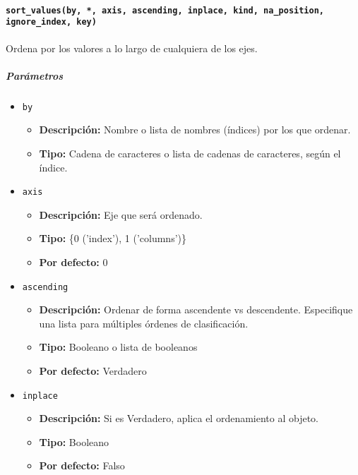 \paragraph{\texttt{sort\_values(by, *, axis, ascending, inplace, kind,
        na\_position, ignore\_index, key)}} Ordena por los valores a lo largo de
cualquiera de los ejes.

\subparagraph{\textbf{Parámetros}}
\begin{itemize}
    \item \texttt{by}
          \begin{itemize}
              \item \textbf{Descripción:} Nombre o lista de nombres (índices)
                    por los que ordenar.
              \item \textbf{Tipo:} Cadena de caracteres o lista de cadenas de
                    caracteres, según el índice.
          \end{itemize}

    \item \texttt{axis}
          \begin{itemize}
              \item \textbf{Descripción:} Eje que será ordenado.
              \item \textbf{Tipo:} \{0 ('index'), 1 ('columns')\}
              \item \textbf{Por defecto:} 0
          \end{itemize}

    \item \texttt{ascending}
          \begin{itemize}
              \item \textbf{Descripción:} Ordenar de forma ascendente vs
                    descendente. Especifique una lista para múltiples órdenes de clasificación.
              \item \textbf{Tipo:} Booleano o lista de booleanos
              \item \textbf{Por defecto:} Verdadero
          \end{itemize}

    \item \texttt{inplace}
          \begin{itemize}
              \item \textbf{Descripción:} Si es Verdadero, aplica el
                    ordenamiento al objeto.
              \item \textbf{Tipo:} Booleano
              \item \textbf{Por defecto:} Falso
          \end{itemize}


\end{itemize}
